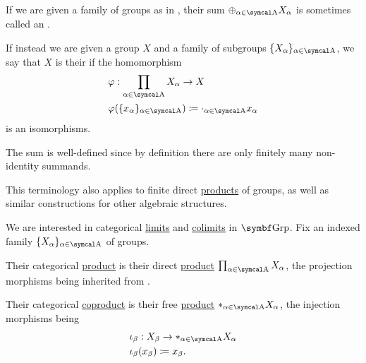\begin{remark}\label{def:group_direct_sum_external_internal}\cite[126]{Knapp2016BAlg}
  If we are given a family of groups as in , their sum \( \oplus_{\al \in \CA} X_\al \) is sometimes called an .

  If instead we are given a group \( X \) and a family of subgroups \( \{ X_\al \}_{\al \in \CA} \), we say that \( X \) is their  if the homomorphism
  \begin{align*}
    &\varphi: \prod_{\al \in \CA} X_\al \to X \\
    &\varphi(\{ x_\al \}_{\al \in \CA}) \coloneqq \cdot_{\al \in \CA} x_\al
  \end{align*}
  is an isomorphisms.

  The sum is well-defined since by definition there are only finitely many non-identity summands.

  This terminology also applies to finite direct \hyperref[def:group_direct_product]{products} of groups, as well as similar constructions for other algebraic structures.
\end{remark}

\begin{proposition}\label{thm:group_categorical_limits}
  We are interested in categorical \hyperref[def:categorical_limit]{limits} and \hyperref[def:categorical_colimit]{colimits} in \( \Cat{Grp} \). Fix an indexed family  \( \{ X_\al \}_{\al \in \CA} \) of groups.
  \begin{defenum}
     Their categorical \hyperref[def:categorical_product]{product} is their direct \hyperref[def:group_direct_product]{product} \( \prod_{\al \in \CA} X_\al \), the projection morphisms being inherited from .

     Their categorical \hyperref[def:categorical_coproduct]{coproduct} is their free \hyperref[def:group_free_product]{product} \( \ast_{\al \in \CA} X_\al \), the injection morphisms being
    \begin{align*}
      &\iota_\beta: X_\beta \to \ast_{\al \in \CA} X_\al \\
      &\iota_\beta(x_\beta) \coloneqq x_\beta.
    \end{align*}
  \end{defenum}
\end{proposition}

